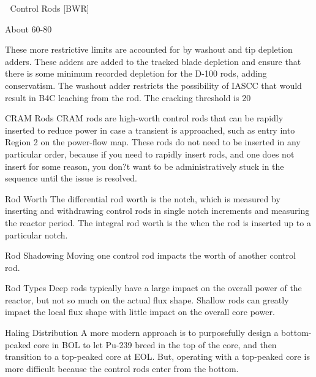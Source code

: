 \documentclass[10pt]{article}
\begin{document}

Control Rods [BWR]


About 60-80%


These more restrictive limits are accounted for by washout and tip depletion adders. These adders are added to the tracked blade depletion and ensure that there is some minimum recorded depletion for the D-100 rods, adding conservatism. The washout adder restricts the possibility of IASCC that would result in B4C leaching from the rod. The cracking threshold is 20%


CRAM Rods
CRAM rods are high-worth control rods that can be rapidly inserted to reduce power in case a transient is approached, such as entry into Region 2 on the power-flow map. These rods do not need to be inserted in any particular order, because if you need to rapidly insert rods, and one does not insert for some reason, you don?t want to be administratively stuck in the sequence until the issue is resolved. 

Rod Worth
The differential rod worth is the notch, which is measured by inserting and withdrawing control rods in single notch increments and measuring the reactor period. The integral rod worth is the  when the rod is inserted up to a particular notch. 

Rod Shadowing
Moving one control rod impacts the worth of another control rod. 

Rod Types
Deep rods typically have a large impact on the overall power of the reactor, but not so much on the actual flux shape. Shallow rods can greatly impact the local flux shape with little impact on the overall core power. 

Haling Distribution
A more modern approach is to purposefully design a bottom-peaked core in BOL to let Pu-239 breed in the top of the core, and then transition to a top-peaked core at EOL. But, operating with a top-peaked core is more difficult because the control rods enter from the bottom. 
\end{document}

